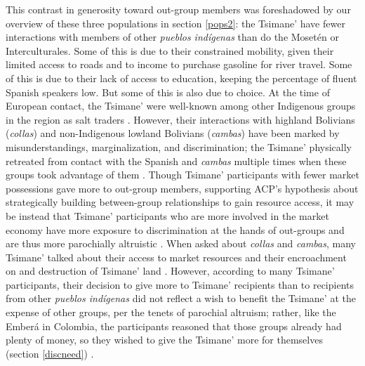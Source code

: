 \documentclass[bibauthoryear]{aa}
\begin{document}
This contrast in generosity toward out-group members was foreshadowed by our overview of these three populations in section \ref{pops2}: the Tsimane' have fewer interactions with members of other \textit{pueblos ind\'igenas} than do the Moset\'en or Interculturales. Some of this is due to their constrained mobility, given their limited access to roads and to income to purchase gasoline for river travel. Some of this is due to their lack of access to education, keeping the percentage of fluent Spanish speakers low. But some of this is also due to choice. At the time of European contact, the Tsimane' were well-known among other Indigenous groups in the region as salt traders \citep{godoy2015natural,  ref947717999}. However, their interactions with highland Bolivians (\textit{collas}) and non-Indigenous lowland Bolivians (\textit{cambas}) have been marked by misunderstandings, marginalization, and discrimination; the Tsimane' physically retreated from contact with the Spanish and \textit{cambas} multiple times when these groups took advantage of them \citep{godoy2015natural, ringhofer2010exploring, tomas2008tsimane}. Though Tsimane' participants with fewer market possessions gave more to out-group members, supporting ACP's hypothesis about strategically building between-group relationships to gain resource access, it may be instead that Tsimane' participants who are more involved in the market economy have more exposure to discrimination at the hands of out-groups and are thus more parochially altruistic \citep{pisor2018diversify}. When asked about \textit{collas} and \textit{cambas}, many Tsimane' talked about their access to market resources and their encroachment on and destruction of Tsimane' land \citep{pisor2018diversify}. However, according to many Tsimane' participants, their decision to give more to Tsimane' recipients than to recipients from other \textit{pueblos ind\'igenas} did not reflect a wish to benefit the Tsimane' at the expense of other groups, per the tenets of parochial altruism; rather, like the Ember\'a in Colombia, the participants reasoned that those groups already had plenty of money, so they wished to give the Tsimane' more for themselves (section \ref{discneed}) \citep{Pisor2020}.
	
\end{document}
